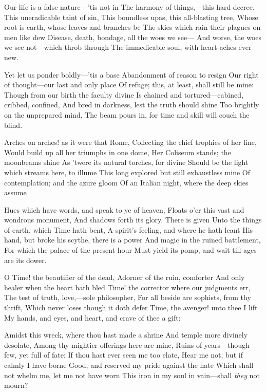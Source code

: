\documentclass[10pt,twocolumn]{book}
\begin{document}
   Our life is a false nature---'tis not in
   The harmony of things,---this hard decree,
   This uneradicable taint of sin,
   This boundless upas, this all-blasting tree,
   Whose root is earth, whose leaves and branches be
   The skies which rain their plagues on men like dew\textemdash
   Disease, death, bondage, all the woes we see---
   And worse, the woes we see not---which throb through
The immedicable soul, with heart-aches ever new.


   Yet let us ponder boldly---'tis a base
   Abandonment of reason to resign
   Our right of thought---our last and only place
   Of refuge; this, at least, shall still be mine:
   Though from our birth the faculty divine
   Is chained and tortured---cabined, cribbed, confined,
   And bred in darkness, lest the truth should shine
   Too brightly on the unprepared mind,
The beam pours in, for time and skill will couch the blind.


   Arches on arches! as it were that Rome,
   Collecting the chief trophies of her line,
   Would build up all her triumphs in one dome,
   Her Coliseum stands; the moonbeams shine
   As 'twere its natural torches, for divine
   Should be the light which streams here, to illume
   This long explored but still exhaustless mine
   Of contemplation; and the azure gloom
Of an Italian night, where the deep skies assume


   Hues which have words, and speak to ye of heaven,
   Floats o'er this vast and wondrous monument,
   And shadows forth its glory.  There is given
   Unto the things of earth, which Time hath bent,
   A spirit's feeling, and where he hath leant
   His hand, but broke his scythe, there is a power
   And magic in the ruined battlement,
   For which the palace of the present hour
Must yield its pomp, and wait till ages are its dower.


   O Time! the beautifier of the dead,
   Adorner of the ruin, comforter
   And only healer when the heart hath bled\textemdash
   Time! the corrector where our judgments err,
   The test of truth, love,---sole philosopher,
   For all beside are sophists, from thy thrift,
   Which never loses though it doth defer\textemdash
   Time, the avenger! unto thee I lift
My hands, and eyes, and heart, and crave of thee a gift:


   Amidst this wreck, where thou hast made a shrine
   And temple more divinely desolate,
   Among thy mightier offerings here are mine,
   Ruins of years---though few, yet full of fate:
   If thou hast ever seen me too elate,
   Hear me not; but if calmly I have borne
   Good, and reserved my pride against the hate
   Which shall not whelm me, let me not have worn
This iron in my soul in vain---shall \textit{they} not mourn?
\end{document}
